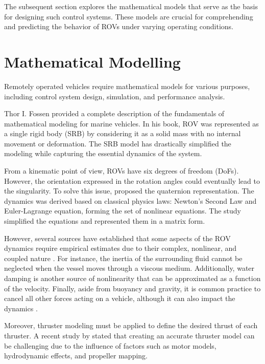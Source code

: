     The subsequent section explores the mathematical models that serve as the basis for designing 
    such control systems. These models are crucial for comprehending and predicting 
    the behavior of ROVs under varying operating conditions.

\section{Mathematical Modelling}

    Remotely operated vehicles require mathematical models for various purposes, including control
    system design, simulation, and performance analysis.

    Thor I. Fossen \cite{fossen:guidance} provided a complete description of the fundamentals of mathematical modeling for marine
    vehicles. In his book, ROV was represented as a single rigid body (SRB) by considering it as a solid mass with no internal movement or deformation. The SRB model has drastically simplified the modeling while capturing the essential dynamics of the system. 

    From a kinematic point of view, ROVs have six degrees of freedom (DoFs). However, the orientation expressed in the rotation angles could eventually lead to the singularity. To solve this issue,
    \cite{quat_smc} proposed the quaternion representation. The dynamics was derived based on classical physics laws: Newton's Second Law and Euler-Lagrange equation, forming the set of nonlinear equations. The study \cite{identification} simplified the equations and represented them in a matrix form.

    However, several sources have established that some aspects of the ROV dynamics require empirical estimates due to their complex, nonlinear, and coupled nature \cite{fossen:guidance, bluerov}. For instance, the inertia of the surrounding fluid cannot be neglected when the vessel moves through a viscous medium. Additionally, water damping is another source of nonlinearity that can be approximated as a function of the velocity. Finally, aside from buoyancy and
    gravity, it is common practice to cancel all other forces acting on a vehicle, although it can also impact the dynamics \cite{bluerov}.

    Moreover, thruster modeling must be applied to define the desired thrust of each thruster. A recent study by \cite{bluerov} stated that creating an accurate thruster model can be challenging due to the influence of factors such as motor models, hydrodynamic effects, and propeller mapping.
    
